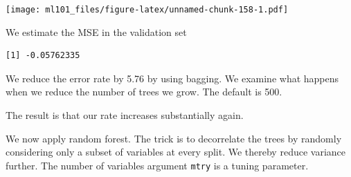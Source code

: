 \documentclass[]{article}
\newenvironment{Shaded}{\begin{snugshade}}{\end{snugshade}}
\newcommand{\CommentTok}[1]{\textcolor[rgb]{0.56,0.35,0.01}{\textit{#1}}}
\newcommand{\DataTypeTok}[1]{\textcolor[rgb]{0.13,0.29,0.53}{#1}}
\newcommand{\DecValTok}[1]{\textcolor[rgb]{0.00,0.00,0.81}{#1}}
\newcommand{\KeywordTok}[1]{\textcolor[rgb]{0.13,0.29,0.53}{\textbf{#1}}}
\newcommand{\NormalTok}[1]{#1}
\newcommand{\OperatorTok}[1]{\textcolor[rgb]{0.81,0.36,0.00}{\textbf{#1}}}
\newcommand{\OtherTok}[1]{\textcolor[rgb]{0.56,0.35,0.01}{#1}}
\newcommand{\StringTok}[1]{\textcolor[rgb]{0.31,0.60,0.02}{#1}}
\begin{document}
\texttt{[image: ml101\_files/figure-latex/unnamed-chunk-158-1.pdf]}

We estimate the MSE in the validation set

\begin{Shaded}
\end{Shaded}

\begin{verbatim}
[1] -0.05762335
\end{verbatim}

We reduce the error rate by 5.76\(%
\) by using bagging. We examine what happens when we reduce the number of trees we grow. The default is 500.

\begin{Shaded}
\end{Shaded}

The result is that our rate increases substantially again.

We now apply random forest. The trick is to decorrelate the trees by randomly considering only a subset of variables at every split. We thereby reduce variance further. The number of variables argument \texttt{mtry} is a tuning parameter.
\end{document}
